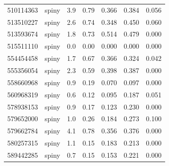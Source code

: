 \begin{tabular}{llrrrrr}
510114363 & spiny & 3.9 & 0.79 & 0.366 & 0.384 & 0.056\\
513510227 & spiny & 2.6 & 0.74 & 0.348 & 0.450 & 0.060\\
513593674 & spiny & 1.8 & 0.73 & 0.514 & 0.479 & 0.000\\
515511110 & spiny & 0.0 & 0.00 & 0.000 & 0.000 & 0.000\\
554454458 & spiny & 1.7 & 0.67 & 0.366 & 0.324 & 0.042\\
555356054 & spiny & 2.3 & 0.59 & 0.398 & 0.387 & 0.000\\
558660968 & spiny & 0.9 & 0.19 & 0.070 & 0.097 & 0.000\\
560968319 & spiny & 0.6 & 0.12 & 0.095 & 0.187 & 0.051\\
578938153 & spiny & 0.9 & 0.17 & 0.123 & 0.230 & 0.000\\
579652000 & spiny & 1.0 & 0.26 & 0.184 & 0.273 & 0.100\\
579662784 & spiny & 4.1 & 0.78 & 0.356 & 0.376 & 0.000\\
580257315 & spiny & 1.1 & 0.15 & 0.183 & 0.213 & 0.000\\
589442285 & spiny & 0.7 & 0.15 & 0.153 & 0.221 & 0.000\\
\bottomrule
\end{tabular}
